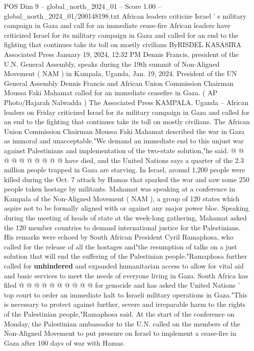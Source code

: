 \begin{textsample}{POS Dim 9 – global\_north\_2024\_01 – Score 1.00 – global\_north\_2024\_01/200148198.txt}  \label{ex:f9_pos_269}
African leaders criticize Israel ' s military campaign in Gaza and call for an immediate cease-fire African leaders have criticized Israel for its military campaign in Gaza and called for an end to the fighting that continues take its toll on mostly civilians ByRISDEL KASASIRA Associated Press January 19, 2024, 12:32 PM Dennis Francis, president of the U.N.
General Assembly, speaks during the 19th summit of Non-Aligned Movement ( NAM ) in Kampala, Uganda, Jan. 19, 2024.
President of the UN General Assembly Dennis Francis and African Union Commission Chairman Moussa Faki Mahamat called for an immediate ceasefire in Gaza. ( AP Photo/Hajarah Nalwadda ) The Associated Press KAMPALA, Uganda -- African leaders on Friday criticized Israel for its military campaign in Gaza and called for an end to the fighting that continues take its toll on mostly civilians.
The African Union Commission Chairman Moussa Faki Mahamat described the war in Gaza as immoral and unacceptable."We demand an immediate end to this unjust war against Palestinians and implementation of the two-state solution,"he said. @ @ @ @ @ @ @ @ @ @ have died, and the United Nations says a quarter of the 2.3 million people trapped in Gaza are starving.
In Israel, around 1,200 people were killed during the Oct. 7 attack by Hamas that sparked the war and saw some 250 people taken hostage by militants.
Mahamat was speaking at a conference in Kampala of the Non-Aligned Movement ( NAM ), a group of 120 states which aspire not to be formally aligned with or against any major power bloc.
Speaking during the meeting of heads of state at the week-long gathering, Mahamat asked the 120 member countries to demand international justice for the Palestinians.
His remarks were echoed by South African President Cyril Ramaphosa, who called for the release of all the hostages and"the resumption of talks on a just solution that will end the suffering of the Palestinian people."Ramaphosa further called for \textbf{unhindered} and expanded humanitarian access to allow for vital aid and basic services to meet the needs of everyone living in Gaza.
South Africa has filed @ @ @ @ @ @ @ @ @ @ for genocide and has asked the United Nations ' top court to order an immediate halt to Israeli military operations in Gaza."This is necessary to protect against further, severe and irreparable harm to the rights of the Palestinian people,"Ramaphosa said.
At the start of the conference on Monday, the Palestinian ambassador to the U.N. called on the members of the Non-Aligned Movement to put pressure on Israel to implement a cease-fire in Gaza after 100 days of war with Hamas.

\end{textsample}
